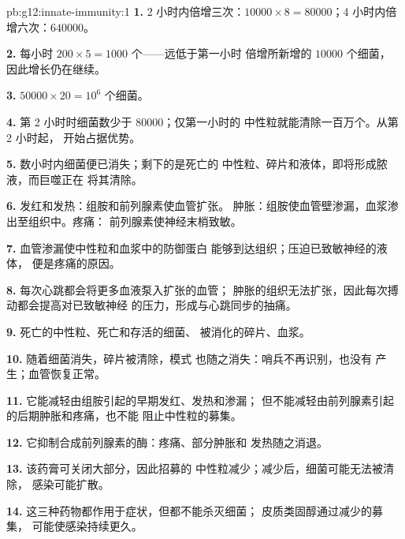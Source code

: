 \begin{solution}{pb:g12:innate-immunity:1}
\textbf{1.} 2 小时内倍增三次：$\num{10000} \times 8 =
\num{80000}$；4 小时内倍增六次：$\num{640000}$。

\textbf{2.} 每小时 $200 \times 5 = 1000$ 个——远低于第一小时
倍增所新增的 $\num{10000}$ 个细菌，
因此增长仍在继续。

\textbf{3.} $\num{50000} \times 20 = 10^6$ 个细菌。

\textbf{4.} 第 2 小时时细菌数少于 $\num{80000}$；仅第一小时的
中性粒就能清除一百万个。从第 2 小时起，
开始占据优势。

\textbf{5.} 数小时内细菌便已消失；剩下的是死亡的
中性粒、碎片和液体，即将形成脓液，而巨噬正在
将其清除。

\textbf{6.} 发红和发热：组胺和前列腺素使血管扩张。
肿胀：组胺使血管壁渗漏，血浆渗出至组织中。疼痛：
前列腺素使神经末梢致敏。

\textbf{7.} 血管渗漏使中性粒和血浆中的防御蛋白
能够到达组织；压迫已致敏神经的液体，
便是疼痛的原因。

\textbf{8.} 每次心跳都会将更多血液泵入扩张的血管；
肿胀的组织无法扩张，因此每次搏动都会提高对已致敏神经
的压力，形成与心跳同步的抽痛。

\textbf{9.} 死亡的中性粒、死亡和存活的细菌、
被消化的碎片、血浆。

\textbf{10.} 随着细菌消失，碎片被清除，模式
也随之消失：哨兵不再识别，也没有
产生；血管恢复正常。

\textbf{11.} 它能减轻由组胺引起的早期发红、发热和渗漏；
但不能减轻由前列腺素引起的后期肿胀和疼痛，也不能
阻止中性粒的募集。

\textbf{12.} 它抑制合成前列腺素的酶：疼痛、部分肿胀和
发热随之消退。

\textbf{13.} 该药膏可关闭大部分，因此招募的
中性粒减少；减少后，细菌可能无法被清除，
感染可能扩散。

\textbf{14.} 这三种药物都作用于症状，但都不能杀灭细菌；
皮质类固醇通过减少的募集，
可能使感染持续更久。


\end{solution}
